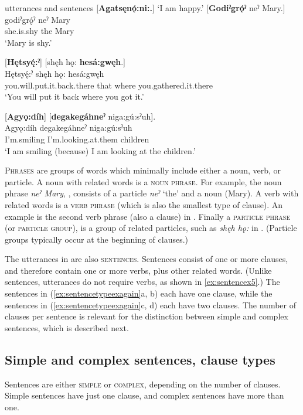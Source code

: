 \ea\label{ex:sentencetypeexagain} utterances and sentences
\ea {}[\textbf{Agatsęnǫ́:ni:.}] \label{ex:sentencetypeexagaina}
\glt ‘I am happy.’
\ex  {}[\textbf{Godiˀgrǫ́ˀ} neˀ Mary.]\\\label{ex:sentencetypeexagainb}
\gll godiˀgrǫ́ˀ neˀ Mary\\
she.is.shy the Mary\\
\glt ‘Mary is shy.’

\ex {}[\textbf{Hętsyę́:ˀ}] [shęh hǫ: \textbf{hesá:gwęh}.]\\\label{ex:sentencetypeexagainc}
\gll Hętsyę́:ˀ shęh hǫ: hesá:gwęh\\
you.will.put.it.back.there that where you.gathered.it.there\\
\glt ‘You will put it back where you got it.’

\ex {}[\textbf{Agyǫ:díh}] [\textbf{degakegáhneˀ} niga:gú:sˀuh].\\\label{ex:sentencetypeexagaind}
\gll Agyǫ:díh degakegáhneˀ niga:gú:sˀuh\\
I’m.smiling I’m.looking.at.them children\\
\glt ‘I am smiling (because) I am looking at the children.’ 
\z
\z

\textsc{Phrases} are groups of words which minimally include either a noun, verb, or particle. A noun with related words is a \textsc{noun phrase}. For example, the noun phrase \textit{neˀ Mary}, , consists of a particle \textit{neˀ} ‘the’ and a noun (Mary). A verb with related words is a \textsc{verb phrase} (which is also the smallest type of clause). An example is the second verb phrase (also a clause) in . Finally a \textsc{particle phrase} (or \textsc{particle group}), is a group of related particles, such as \textit{shęh hǫ:} in . (Particle groups typically occur at the beginning of clauses.)

The utterances in  are also \textsc{sentences}. Sentences consist of one or more clauses, and therefore contain one or more verbs, plus other related words. (Unlike sentences, utterances do not require verbs, as shown in \ref{ex:sentencex5}.) The sentences in (\ref{ex:sentencetypeexagain}a, b) each have one clause, while the sentences in (\ref{ex:sentencetypeexagain}c, d) each have two clauses. The number of clauses per sentence is relevant for the distinction between simple and complex sentences, which is described next.  


\subsection{Simple and complex sentences, clause types} \label{Simple and complex sentences, clause types}
Sentences are either \textsc{simple} or \textsc{complex}, depending on the number of clauses. Simple sentences have just one clause, and complex sentences have more than one. 

